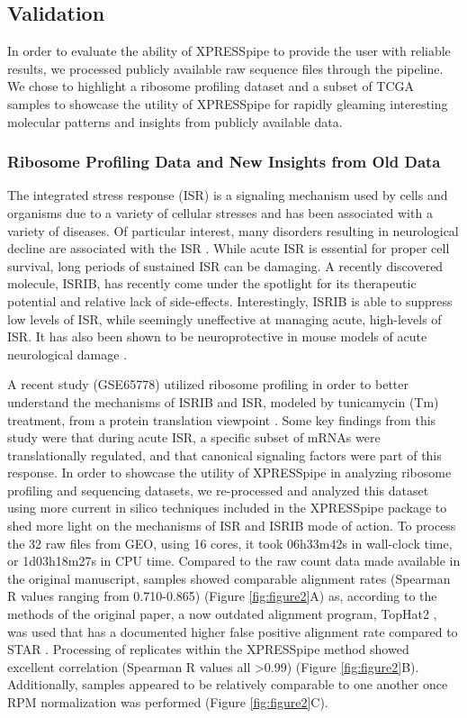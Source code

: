 \documentclass[11pt, a4paper, oneside]{article}
\begin{document}
\subsection{Validation}
In order to evaluate the ability of XPRESSpipe to provide the user with reliable results, we processed publicly available raw sequence files through the pipeline. We chose to highlight a ribosome profiling dataset and a subset of TCGA samples to showcase the utility of XPRESSpipe for rapidly gleaming interesting molecular patterns and insights from publicly available data.

\subsubsection{Ribosome Profiling Data and New Insights from Old Data}
The integrated stress response (ISR) is a signaling mechanism used by cells and organisms due to a variety of cellular stresses and has been associated with a variety of diseases. Of particular interest, many disorders resulting in neurological decline are associated with the ISR \cite{isr_disease}. While acute ISR is essential for proper cell survival, long periods of sustained ISR can be damaging. A recently discovered molecule, ISRIB, has recently come under the spotlight for its therapeutic potential and relative lack of side-effects. Interestingly, ISRIB is able to suppress low levels of ISR, while seemingly uneffective at managing acute, high-levels of ISR. It has also been shown to be neuroprotective in mouse models of acute neurological damage \cite{isrib_activation, isrib_structure, isrib_riboseq, isrib_neuroprotective}.

A recent study (GSE65778) utilized ribosome profiling in order to better understand the mechanisms of ISRIB and ISR, modeled by tunicamycin (Tm) treatment, from a protein translation viewpoint \cite{isrib_riboseq}. Some key findings from this study were that during acute ISR, a specific subset of mRNAs were translationally regulated, and that canonical signaling factors were part of this response. In order to showcase the utility of XPRESSpipe in analyzing ribosome profiling and sequencing datasets, we re-processed and analyzed this dataset using more current in silico techniques included in the XPRESSpipe package to shed more light on the mechanisms of ISR and ISRIB mode of action. To process the 32 raw files from GEO, using 16 cores, it took 06h33m42s in wall-clock time, or 1d03h18m27s in CPU time. Compared to the raw count data made available in the original manuscript, samples showed comparable alignment rates (Spearman R values ranging from 0.710-0.865) (Figure \ref{fig:figure2}A) as, according to the methods of the original paper, a now outdated alignment program, TopHat2 \cite{tophat2}, was used that has a documented higher false positive alignment rate compared to STAR \cite{alignment_benchmark, star}. Processing of replicates within the XPRESSpipe method showed excellent correlation (Spearman R values all \textgreater 0.99) (Figure \ref{fig:figure2}B). Additionally, samples appeared to be relatively comparable to one another once RPM normalization was performed (Figure \ref{fig:figure2}C).
\end{document}
